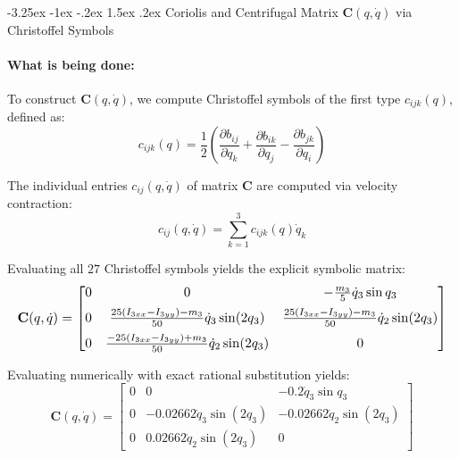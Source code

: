 ﻿\documentclass[11pt, a4paper]{article}
\makeatletter
\renewcommand{\subsection}{\@startsection{subsection}{2}{\z@}%
    {-3.25ex \@plus -1ex \@minus -.2ex}%
    {1.5ex \@plus .2ex}%
    {\normalfont\large\bfseries\color{brandaccent}}}
\makeatother
\begin{document}
\subsection{Coriolis and Centrifugal Matrix \texorpdfstring{$\mathbf{C}(q, \dot{q})$}{C(q, dq)} via Christoffel Symbols}
\paragraph{What is being done:}
To construct $\mathbf{C}(q, \dot{q})$, we compute Christoffel symbols of the first type $c_{ijk}(q)$, defined as:
\begin{equation}
    c_{ijk}(q) = \frac{1}{2} \left( \frac{\partial b_{ij}}{\partial q_k} + \frac{\partial b_{ik}}{\partial q_j} - \frac{\partial b_{jk}}{\partial q_i} \right)
\end{equation}

The individual entries $c_{ij}(q, \dot{q})$ of matrix $\mathbf{C}$ are computed via velocity contraction:
\begin{equation}
    c_{ij}(q, \dot{q}) = \sum_{k=1}^{3} c_{ijk}(q) \dot{q}_k
\end{equation}

Evaluating all $27$ Christoffel symbols yields the explicit symbolic matrix:
\begin{equation}
\resizebox{\linewidth}{!}{$
\mathbf{C}(q, \dot{q}) = \begin{bmatrix}
0 & 0 & -\frac{m_3}{5}\dot{q}_3\sin q_3 \\[0.5em]
0 & \frac{25(I_{3xx}-I_{3yy})-m_3}{50}\dot{q}_3\sin(2q_3) & \frac{25(I_{3xx}-I_{3yy})-m_3}{50}\dot{q}_2\sin(2q_3) \\[0.5em]
0 & \frac{-25(I_{3xx}-I_{3yy})+m_3}{50}\dot{q}_2\sin(2q_3) & 0
\end{bmatrix}
$}
\end{equation}

Evaluating numerically with exact rational substitution yields:
\begin{equation}
\mathbf{C}(q, \dot{q}) = \begin{bmatrix}
0 & 0 & -0.2\dot{q}_3\sin q_3 \\[0.3em]
0 & -0.02662\dot{q}_3\sin(2q_3) & -0.02662\dot{q}_2\sin(2q_3) \\[0.3em]
0 & 0.02662\dot{q}_2\sin(2q_3) & 0
\end{bmatrix}
\end{equation}
\end{document}
